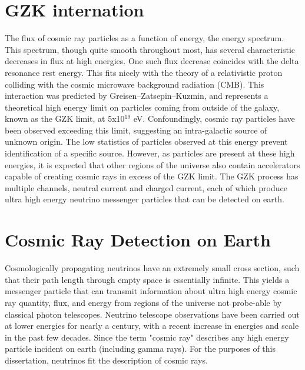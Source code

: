 \section{GZK internation}
		The flux of cosmic ray particles as a function of energy, the energy spectrum.  This spectrum, though quite smooth throughout most, has several characteristic decreases in flux at high energies.  One such flux decrease coincides with the delta resonance rest energy.  This fits nicely with the theory of a relativistic proton colliding with the cosmic microwave background radiation (CMB).  This interaction was predicted by Greisen–Zatsepin–Kuzmin, and represents a theoretical high energy limit on particles coming from outside of the galaxy, known as the GZK limit, at 5x10$^{19}$ eV.\cite{GZK}  Confoundingly, cosmic ray particles have been observed exceeding this limit, suggesting an intra-galactic source of unknown origin.  The low statistics of particles observed at this energy prevent identification of a specific source.  However, as particles are present at these high energies, it is expected that other regions of the universe also contain accelerators capable of creating cosmic rays in excess of the GZK limit.  The GZK process has multiple channels, neutral current and charged current, each of which produce ultra high energy neutrino messenger particles that can be detected on earth.

\section{Cosmic Ray Detection on Earth}
		Cosmologically propagating neutrinos have an extremely small cross section, such that their path length through empty space is essentially infinite.  This yields a messenger particle that can transmit information about ultra high energy cosmic ray quantity, flux, and energy from regions of the universe not probe-able by classical photon telescopes.  Neutrino telescope observations have been carried out at lower energies for nearly a century, with a recent increase in energies and scale in the past few decades.  Since the term "cosmic ray" describes any high energy particle incident on earth (including gamma rays).  For the purposes of this dissertation, neutrinos fit the description of cosmic rays.
